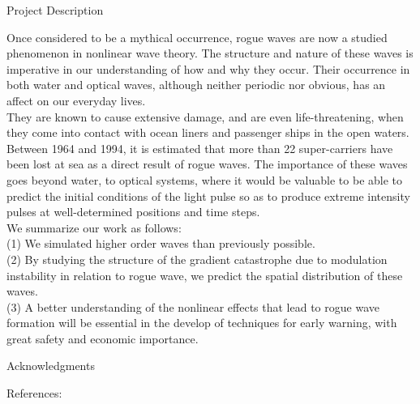 \documentclass[final]{beamer}
\begin{document}
\begin{frame}{}
\begin{columns}[t]
\begin{column}{.255\linewidth}
		\begin{block}{Project Description}

Once considered to be a mythical occurrence, rogue waves are now a studied phenomenon in nonlinear wave theory. The structure and nature of these waves is imperative in our understanding of how and why they occur. Their occurrence in both water and optical waves, although neither periodic nor obvious, has an affect on our everyday lives. \\

\vspace{3mm}
They are known to cause extensive damage, and are even life-threatening, when they come into contact with ocean liners and passenger ships in the open waters. Between 1964 and 1994, it is estimated that more than 22 super-carriers have been lost at sea as a direct result of rogue waves. The importance of these waves goes beyond water, to optical systems, where it would be valuable to be able to predict the initial conditions of the light pulse so as to produce extreme intensity pulses at well-determined positions and time steps.\\

\vspace{0.5cm}
We summarize our work as follows:\\
		
		\vspace{.5cm}
(1) We simulated higher order waves than previously possible.\\

			\vspace{.5cm}
(2) By studying the structure of the gradient catastrophe due to modulation instability in relation to rogue wave, we predict the spatial distribution of these waves.\\

			\vspace{.5cm}	
(3) A better understanding of the nonlinear effects that lead to rogue wave formation will be essential in the develop of techniques for early warning, with great safety and economic importance.\\

\vspace{cm}
\end{block}
\vspace{0cm}
	\begin{block}{Acknowledgments}
	

{\small References:}\\


\end{block}
\end{column}
\end{columns}
\end{frame}
\end{document}
